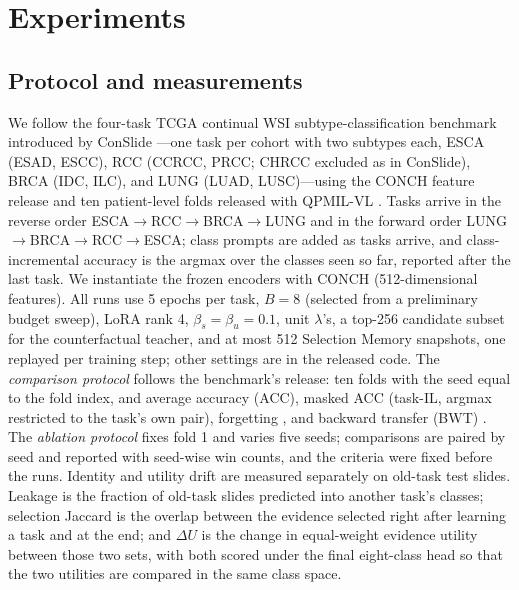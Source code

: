 \documentclass{article}
\begin{document}
\section{Experiments}
\label{sec:exp}

\subsection{Protocol and measurements}
\label{ssec:protocol}

We follow the four-task TCGA continual WSI subtype-classification benchmark introduced by ConSlide \cite{huang2023conslide}---one task per cohort with two subtypes each, ESCA (ESAD, ESCC), RCC (CCRCC, PRCC; CHRCC excluded as in ConSlide), BRCA (IDC, ILC), and LUNG (LUAD, LUSC)---using the CONCH \cite{lu2024conch} feature release and ten patient-level folds released with QPMIL-VL \cite{gou2025qpmil}. Tasks arrive in the reverse order ESCA$\rightarrow$RCC$\rightarrow$BRCA$\rightarrow$LUNG and in the forward order LUNG$\rightarrow$BRCA$\rightarrow$RCC$\rightarrow$ESCA; class prompts are added as tasks arrive, and class-incremental accuracy is the argmax over the classes seen so far, reported after the last task. We instantiate the frozen encoders with CONCH (512-dimensional features). All runs use 5 epochs per task, $B=8$ (selected from a preliminary budget sweep), LoRA rank 4, $\beta_s{=}\beta_u{=}0.1$, unit $\lambda$'s, a top-256 candidate subset for the counterfactual teacher, and at most 512 Selection Memory snapshots, one replayed per training step; other settings are in the released code. The \emph{comparison protocol} follows the benchmark's release: ten folds with the seed equal to the fold index, and average accuracy (ACC), masked ACC (task-IL, argmax restricted to the task's own pair), forgetting \cite{chaudhry2018rwalk}, and backward transfer (BWT) \cite{lopezpaz2017gem}. The \emph{ablation protocol} fixes fold 1 and varies five seeds; comparisons are paired by seed and reported with seed-wise win counts, and the criteria were fixed before the runs. Identity and utility drift are measured separately on old-task test slides. Leakage is the fraction of old-task slides predicted into another task's classes; selection Jaccard is the overlap between the evidence selected right after learning a task and at the end; and $\Delta U$ is the change in equal-weight evidence utility between those two sets, with both scored under the final eight-class head so that the two utilities are compared in the same class space.
\end{document}
